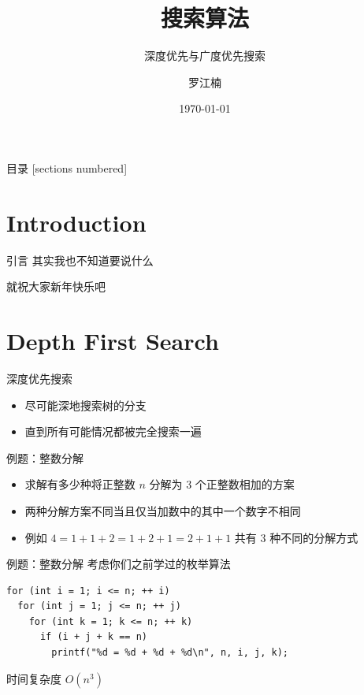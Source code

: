 \documentclass[12pt,aspectratio=169]{beamer}
\title{搜索算法}
\subtitle{深度优先与广度优先搜索}
\date{\today}
\author{罗江楠}
\institute{哈尔滨工业大学（威海）}
\begin{document}
\maketitle

\begin{frame}{目录}
  [sections numbered]
  \tableofcontents[hideallsubsections]
\end{frame}

\section[引言]{Introduction}

\begin{frame}[fragile]{引言}
  其实我也不知道要说什么\pause

  就祝大家新年快乐吧
\end{frame}

\section[深度优先搜索]{Depth First Search}

\begin{frame}[fragile]{深度优先搜索}
  \begin{itemize}
    \item 尽可能深地搜索树的分支
    \item 直到所有可能情况都被完全搜索一遍
  \end{itemize}
\end{frame}

\begin{frame}[fragile]{例题：整数分解}
  \begin{itemize}
    \item 求解有多少种将正整数 $n$ 分解为 $3$ 个正整数相加的方案
    \item 两种分解方案不同当且仅当加数中的其中一个数字不相同
    \item 例如 $4=1+1+2=1+2+1=2+1+1$ 共有 $3$ 种不同的分解方式
  \end{itemize}
\end{frame}

\begin{frame}[fragile]{例题：整数分解}
  考虑你们之前学过的枚举算法
  \begin{verbatim}
for (int i = 1; i <= n; ++ i)
  for (int j = 1; j <= n; ++ j)
    for (int k = 1; k <= n; ++ k)
      if (i + j + k == n)
        printf("%d = %d + %d + %d\n", n, i, j, k);
  \end{verbatim}
  \pause
  时间复杂度 $O(n^3)$
\end{frame}
\end{document}
